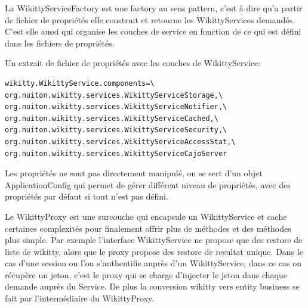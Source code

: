 La WikittyServiceFactory est une factory au sens pattern, c'est à dire qu'a 
partir de fichier de propriétés elle construit et retourne les WikittyServices 
demandés. C'est elle aussi qui organise les couches de service en fonction de ce 
qui est défini dans les fichiers de propriétés.


Un extrait de fichier de propriétés avec les couches de WikittyService:
\begin{verbatim}
wikitty.WikittyService.components=\
org.nuiton.wikitty.services.WikittyServiceStorage,\
org.nuiton.wikitty.services.WikittyServiceNotifier,\
org.nuiton.wikitty.services.WikittyServiceCached,\
org.nuiton.wikitty.services.WikittyServiceSecurity,\
org.nuiton.wikitty.services.WikittyServiceAccessStat,\
org.nuiton.wikitty.services.WikittyServiceCajoServer
\end{verbatim}

Les propriétés ne sont pas directement manipulé, on se sert d'un objet 
ApplicationConfig qui permet de gérer différent niveau de propriétés,
avec des propriétés par défaut si tout n'est pas défini.

Le WikittyProxy est une surcouche qui encapsule un WikittyService et cache 
certaines complexités pour finalement offrir plus de méthodes et des méthodes 
plus simple. Par exemple l'interface WikittyService ne propose que des 
restore de liste de wikitty, alors que le proxy propose des restore de resultat
unique. Dans le cas d'une session ou l'on s'authentifie auprès d'un WikittyService,
 dans ce cas on récupère un jeton, c'est le proxy qui se charge d'injecter le
jeton dans chaque demande auprès du Service. De plus la conversion wikitty
vers entity business se fait par l'intermédiaire du WikittyProxy.
